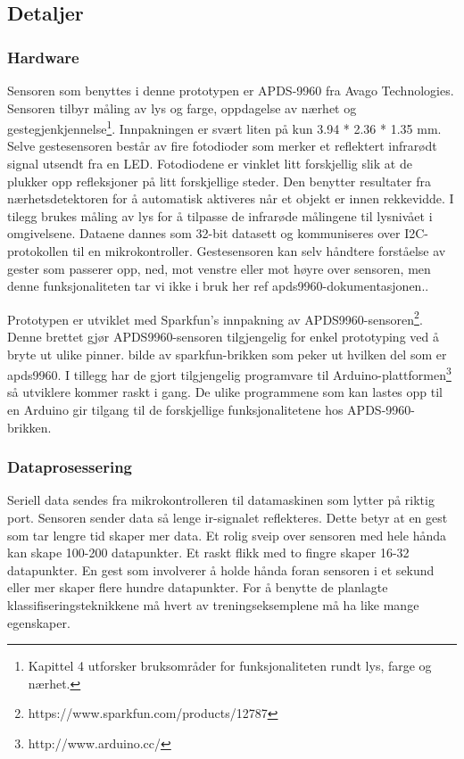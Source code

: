 \subsection*{Detaljer}
\subsubsection*{Hardware}
Sensoren som benyttes i denne prototypen er APDS-9960 fra Avago Technologies. Sensoren tilbyr måling av lys og farge, oppdagelse av nærhet og gestegjenkjennelse\footnote{Kapittel 4 utforsker bruksområder for funksjonaliteten rundt lys, farge og nærhet.}. Innpakningen er svært liten på kun 3.94 * 2.36 * 1.35 mm. Selve gestesensoren består av fire fotodioder som merker et reflektert infrarødt signal utsendt fra en LED. Fotodiodene er vinklet litt forskjellig slik at de plukker opp refleksjoner på litt forskjellige steder. Den benytter resultater fra nærhetsdetektoren for å automatisk aktiveres når et objekt er innen rekkevidde. I tilegg brukes måling av lys for å tilpasse de infrarøde målingene til lysnivået i omgivelsene. Dataene dannes som 32-bit datasett og kommuniseres over I2C-protokollen til en mikrokontroller. Gestesensoren kan selv håndtere forståelse av gester som passerer opp, ned, mot venstre eller mot høyre over sensoren, men denne funksjonaliteten tar vi ikke i bruk her {\color{red} ref apds9960-dokumentasjonen.}.

Prototypen er utviklet med Sparkfun's innpakning av APDS9960-sensoren\footnote{https://www.sparkfun.com/products/12787}. Denne brettet gjør APDS9960-sensoren tilgjengelig for enkel prototyping ved å bryte ut ulike pinner. {\color{red} bilde av sparkfun-brikken som peker ut hvilken del som er apds9960.} I tillegg har de gjort tilgjengelig programvare til Arduino-plattformen\footnote{http://www.arduino.cc/} så utviklere kommer raskt i gang. De ulike programmene som kan lastes opp til en Arduino gir tilgang til de forskjellige funksjonalitetene hos APDS-9960-brikken.

\subsubsection*{Dataprosessering}
Seriell data sendes fra mikrokontrolleren til datamaskinen som lytter på riktig port. Sensoren sender data så lenge ir-signalet reflekteres. Dette betyr at en gest som tar lengre tid skaper mer data. Et rolig sveip over sensoren med hele hånda kan skape 100-200 datapunkter. Et raskt flikk med to fingre skaper 16-32 datapunkter. En gest som involverer å holde hånda foran sensoren i et sekund eller mer skaper flere hundre datapunkter. For å benytte de planlagte klassifiseringsteknikkene må hvert av treningseksemplene må ha like mange egenskaper.

